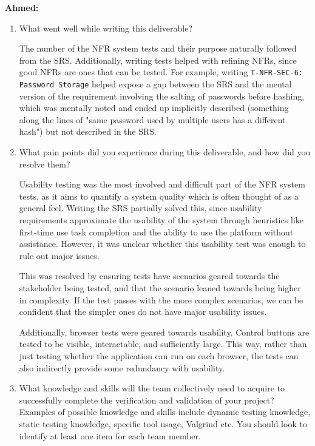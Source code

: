 \documentclass[12pt, titlepage]{article}
\begin{document}
\textbf{Ahmed:}
\begin{enumerate}
  \item What went well while writing this deliverable?

  The number of the NFR system tests and their purpose naturally followed from the SRS.
  Additionally, writing tests helped with refining NFRs, since good NFRs are ones that
  can be tested. For example, writing \texttt{T-NFR-SEC-6: Password Storage} helped
  expose a gap between the SRS and the mental version of the requirement involving the
  salting of passwords before hashing, which was mentally noted and ended up implicitly
  described (something along the lines of "same password used by multiple users has a
  different hash") but not described in the SRS.

  \item What pain points did you experience during this deliverable, and how
    did you resolve them?

  Usability testing was the most involved and difficult part of the NFR system tests,
  as it aims to quantify a system quality which is often thought of as a general feel.
  Writing the SRS partially solved this, since usability requirements approximate the
  usability of the system through heuristics like first-time use task completion and
  the ability to use the platform without assistance. However, it was unclear whether
  this usability test was enough to rule out major issues.
  
  This was resolved by ensuring tests have scenarios geared towards the stakeholder being tested,
  and that the scenario leaned towards being higher in complexity. If the test passes with the more
  complex scenarios, we can be confident that the simpler ones do not have major usability issues.

  Additionally, browser tests were geared towards usability. Control buttons are tested to be visible,
  interactable, and sufficiently large. This way, rather than just testing whether the application
  can run on each browser, the tests can also indirectly provide some redundancy with usability.

  \item What knowledge and skills will the team collectively need to acquire to
  successfully complete the verification and validation of your project?
  Examples of possible knowledge and skills include dynamic testing knowledge,
  static testing knowledge, specific tool usage, Valgrind etc.  You should look to
  identify at least one item for each team member.


\end{enumerate}
\end{document}
